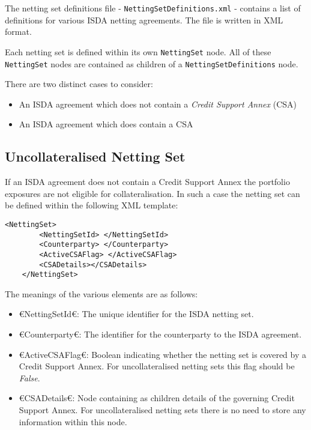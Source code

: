 The netting set definitions file - {\tt NettingSetDefinitions.xml} - 
contains a list of
definitions for various ISDA netting agreements. The file is written
in XML format. 

\vspace{1em}

Each netting set is defined within its own \lstinline!NettingSet!
node. All of these \lstinline!NettingSet! nodes are contained as
children of a \lstinline!NettingSetDefinitions! node.

\vspace{1em}

There are two distinct cases to consider:

\begin{itemize}
\item An ISDA agreement which does not contain a \emph{Credit Support
    Annex} (CSA)
\item An ISDA agreement which does contain a CSA
\end{itemize}
\subsection{Uncollateralised Netting Set}
If an ISDA agreement does not contain a Credit Support Annex the
portfolio exposures are not eligible for collateralisation. In such a
case the netting set can be defined within the following XML template:

\begin{lstlisting}[caption={uncollateralised netting set definition}, label=lst:nettingSetUncollat]
    <NettingSet>
        <NettingSetId> </NettingSetId>
        <Counterparty> </Counterparty>
        <ActiveCSAFlag> </ActiveCSAFlag>
        <CSADetails></CSADetails>
    </NettingSet>
\end{lstlisting}

The meanings of the various elements are as follows:
\begin{itemize}
\item €NettingSetId€: The unique identifier for the ISDA netting set.
\item €Counterparty€: The identifier for the counterparty to the ISDA agreement.
\item €ActiveCSAFlag€: Boolean indicating whether the netting set is
  covered by a Credit Support Annex. For uncollateralised netting sets
  this flag should be \emph{False}.
\item €CSADetails€: Node containing as children details of the governing
  Credit Support Annex. For uncollateralised netting sets there is no
  need to store any information within this node.
\end{itemize}
